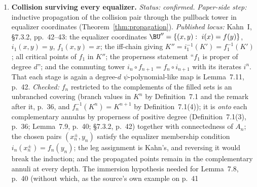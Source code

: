 \begin{remark}
\begin{enumerate}
(Proposition~\ref{prop:excess}, Theorem~\ref{thm:excess-count}).
\emph{Published locus:} nesting and properness of the seed, Kahn~I,
\S6, p.~31 (\(U^r=f^{-r}(U^0)\), each \(f\colon U^{r+1}\to U^r\)
quadratic-like, so \(F=f^p\) is proper of degree \(2^p\)); the little
filled Julia sets \(K_p\), \(K_p(j)=f^j(K_p)\), \(\KK_p\), and
primitivity as pairwise disjointness, Kahn~I, \S1.1; the canonical
choice \(A=K_p\), \(B=\KK_p\) for \((i^p,f^p)\) with central local
degree two, Kahn~I, \S7.4.3, p.~45; and the removal asymmetry, which
is literally Kahn's \(T=(\BU\sm B)\cup A\) against
\(T'=(\BU'\sm f^{-1}B)\cup A'\), Kahn~I, \S7.4.2, p.~45.
\emph{Checked:} the central component has local degree two, so
\(2^p-2>0\) forces an excess component for \(p>1\); the invariance
\(F(K_p(j))=K_p(j)\) plus primitive disjointness gives
\(X\cap B=\varnothing\); and the source-side removal
\(X\subset F^{-1}B\) with target-side non-removal is exactly the
\(T'/T\) mismatch.  The construction meant throughout is the one of
\S7.4.3, not either variant of \S7.4.4, p.~46
(Definition~\ref{def:canonical}).
\item \textbf{Collision surviving every equalizer.}
\emph{Status: confirmed.}
\emph{Paper-side step:} inductive propagation of the collision pair
through the pullback tower in equalizer coordinates
(Theorem~\ref{thm:propagation}).
\emph{Published locus:} Kahn~I, \S7.3.2, pp.~42--43: the equalizer
coordinates \(\BU''=\{(x,y):\ i(x)=f(y)\}\), \(i_1(x,y)=y\),
\(f_1(x,y)=x\); the iff-chain giving
\(K''=i_1^{-1}(K')=f_1^{-1}(K')\); all critical points of \(f_1\) in
\(K''\); the properness statement ``\(f_1\) is proper of degree
\(d\)''; and the commuting tower \(i_n\circ f_{n+1}=f_n\circ i_{n+1}\)
with its iterates \(i^n\).  That each stage is again a degree-\(d\)
\(\psi\)-polynomial-like map is Lemma~7.11, p.~42.
\emph{Checked:} \(f_n\) restricted to the complements of the filled
sets is an unbranched covering (branch values in \(K^n\) by
Definition~7.1 and the remark after it, p.~36, and
\(f_n^{-1}(K^n)=K^{n+1}\) by Definition~7.1(4)); it is \emph{onto}
each complementary annulus by properness of positive degree
(Definition~7.1(3), p.~36; Lemma~7.9, p.~40; \S7.3.2, p.~42) together
with connectedness of \(A_n\); the chosen pairs \((x_n^\pm,y_n)\)
satisfy the equalizer membership condition \(i_n(x_n^\pm)=f_n(y_n)\);
the leg assignment is Kahn's, and reversing it would break the
induction; and the propagated points remain in the complementary
annuli at every depth.  The immersion hypothesis needed for
Lemma~7.8, p.~40 (without which, as the source's own example on p.~41

\end{enumerate}
\end{remark}
